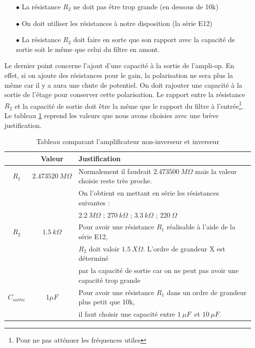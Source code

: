 \begin{itemize}
    \item [$\bullet$] La résistance $R_2$ ne doit pas être trop grande (en dessous de 10k)
    \item [$\bullet$] On doit utiliser les résistances à notre disposition (la série E12)
    \item [$\bullet$] La résistance $R_2$ doit faire en sorte que son rapport avec la capacité de sortie soit le même que celui du filtre en amont.
\end{itemize}

Le dernier point concerne l'ajout d'une capacité à la sortie de l'ampli-op. En effet, si on ajoute des résistances pour le gain, la polarisation ne sera plus la même car il y a aura une chute de potentiel. On doit rajouter une capacité à la sortie de l'étage pour conserver cette polarisation. Le rapport entre la résistance $R_2$ et la capacité de sortie doit être la même que le rapport du filtre à l'entrée\footnote{Pour ne pas atténuer les fréquences utiles}. Le tableau \ref{tab:tabres} reprend les valeurs que nous avons choisies avec une brève justification.

\begin{table}[H]
    \centering
    \begin{tabular}{|c|c|l|}
    \hline
        \cellcolor[RGB]{100,100,100}&\textbf{Valeur} & \textbf{Justification} \\
        \hline
         \textbf{$R_1$} & $2.473520 \ M \Omega$ & Normalement il faudrait $2.473500 \ M \Omega$  mais la valeur choisie reste très proche.\\ 
         && On l'obtient en mettant en série les résistances suivantes : \\
         && $2.2 \ M\Omega$ ; $270 \ k\Omega$ ; $3.3 \ k\Omega$ ; $220 \ \Omega$ \\ 
         \hline
         \textbf{$R_2$} & $1.5 \ k \Omega$ & Pour avoir une résistance $R_1$ réalisable à l'aide de la série E12, 
          \\ &&$R_2$ doit valoir $1.5 \  X \Omega$. L'ordre de grandeur X est déterminé 
           \\ &&par la capacité de sortie car on ne peut pas avoir une capacité trop grande  \\
         \hline
         \textbf{$C_{sortie}$} & $1 \mu F$ & Pour avoir une résistance $R_1$ dans un ordre de grandeur plus petit que 10k, 
         \\ && il faut choisir une capacité entre $1 \ \mu F$\ et $10 \ \mu F$.\ \\
         \hline
    \end{tabular}
    \caption{Tableau comparant l'amplificateur non-inverseur et inverseur}
    \label{tab:tabres}
\end{table}

